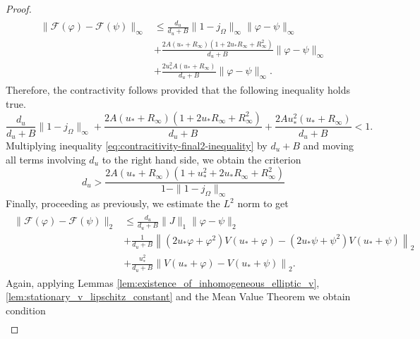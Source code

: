 \documentclass[12pt, a4paper]{article}
\theoremstyle{break}
\theoremstyle{break}
\theoremstyle{break}
\theoremstyle{break}
\theoremstyle{break}
\theoremstyle{break}
\theoremstyle{break}
\begin{document}
\begin{proof}
\begin{align}
        \begin{split}
            \|\mathcal{F}(\varphi) - \mathcal{F}(\psi)\|_\infty
            &\leq
            \frac{d_u}{d_u + B} \|1 - j_\Omega\|_\infty \|\varphi - \psi\|_\infty\\
            &+
            \frac{2A(u_* + R_\infty)
        \left( 1 + 2u_*R_\infty + R^2_\infty \right)}{d_u + B} \|\varphi - \psi\|_\infty \\
            &+ \frac{2u_*^2A(u_* + R_\infty)}{d_u + B}\|\varphi - \psi\|_\infty.
        \end{split}
    \end{align}
    Therefore, the contractivity follows provided that the following inequality holds true.
    \begin{equation}
        \label{eq:contracitivity-final2-inequality}
        \frac{d_u}{d_u + B} \|1 - j_\Omega\|_\infty + 
        \frac{2A(u_* + R_\infty)
        \left( 1 + 2u_*R_\infty + R^2_\infty \right)}{d_u + B} +
        \frac{2A u_*^2(u_* + R_\infty)}{d_u + B} <
        1.
    \end{equation}
    Multiplying inequality \eqref{eq:contracitivity-final2-inequality} by $d_u + B$ and moving all terms involving $d_u$ to the right hand side, we obtain the criterion
    \begin{equation}
        \label{eq:contractivity_final3_inequality}
        d_u
        >
        \frac{2A(u_* + R_\infty)
        \left( 1 + u_*^2 + 2u_*R_\infty + R^2_\infty \right)}{1 - \|1-j_\Omega\|_\infty}
    \end{equation}
    Finally, proceeding as previously, we estimate the $L^2$ norm to get
    \begin{align}
        \label{eq:contraactivity-l2-1}
        \begin{split}
            \|\mathcal{F}(\varphi) - \mathcal{F}(\psi)\|_2
            &\leq
            \frac{d_u}{d_u + B} \|J\|_1 \|\varphi - \psi\|_2 \\
            &+ \frac{1}{d_u + B} \left\|(2u_* \varphi + \varphi^2) V(u_* + \varphi)
            - (2u_* \psi + \psi^2) V(u_* + \psi) \right\|_2 \\
            &+ \frac{u_*^2}{d_u + B}\left\| V(u_* + \varphi) - V(u_* + \psi) \right\|_2.
        \end{split}
    \end{align}
    Again, applying Lemmas \ref{lem:existence_of_inhomogeneous_elliptic_v}, \ref{lem:stationary_v_lipschitz_constant} and the Mean Value Theorem we obtain condition
    \begin{align}

\end{align}
\end{proof}
\end{document}
